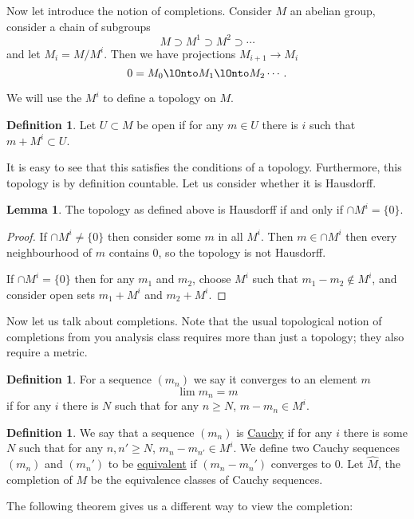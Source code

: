 \documentclass[12 pt]{article}
\theoremstyle{definition}
\newtheorem{lemma}[thm]{Lemma}
\newtheorem{defn}[thm]{Definition}
\renewcommand{\(}{\left(}
\renewcommand{\)}{\right)}
\begin{document}
Now let introduce the notion of completions. Consider $M$ an abelian group, consider a chain of subgroups
\[M \supset M^1 \supset M^2 \supset \cdots\]
and let $M_i=M/M^i$. Then we have projections $M_{i+1} \to M_{i}$
\[0=M_0 \lOnto M_1 \lOnto M_2 \cdots.\]

We will use the $M^i$ to define a topology on $M$.

\begin{defn} Let $U \subset M$ be open if for any $m \in U$ there is $i$ such that $m+M^i \subset U$.
\end{defn}

It is easy to see that this satisfies the conditions of a topology. Furthermore, this topology is by definition countable. Let us consider whether it is Hausdorff.

\begin{lemma} The topology as defined above is Hausdorff if and only if $\cap M^i=\{0\}$.
\end{lemma}
\begin{proof} If $\cap M^i \neq \{0\}$ then consider some $m$ in all $M^i$. Then $m \in \cap M^i$ then every neighbourhood of $m$ contains 0, so the topology is not Hausdorff.

If $\cap M^i =\{0\}$ then for any $m_1$ and $m_2$, choose $M^i$ such that $m_1-m_2 \not \in M^i$, and consider open sets $m_1 +M^i$ and $m_2+M^i$.
\end{proof}

Now let us talk about completions. Note that the usual topological notion of completions from you analysis class requires more than just a topology; they also require a metric.

\begin{defn} For a sequence $(m_n)$ we say it converges to an element $m$
\[\lim m_n=m\]
if for any $i$ there is $N$ such that for any $n \geq N$, $m-m_n \in M^i$.
\end{defn}

\begin{defn} We say that a sequence $(m_n)$ is \underline{Cauchy} if for any $i$ there is some $N$ such that for any $n, n' \geq N$, $m_n-m_{n'} \in M^i$. We define two Cauchy sequences $(m_n)$ and $(m_n')$ to be \underline{equivalent} if $(m_n-m_n')$ converges to 0. Let $\widehat{M}$, the completion of $M$ be the equivalence classes of Cauchy sequences.
\end{defn}

The following theorem gives us a different way to view the completion:
\end{document}
